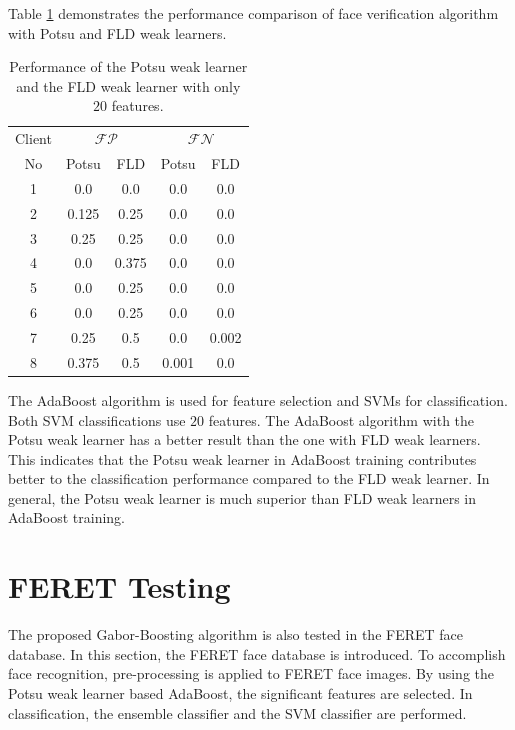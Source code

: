 \mbox{Table} \ref{tab:potsuvsfld} demonstrates the performance comparison of face verification algorithm with Potsu and FLD weak learners.
\begin{table}[ht]
\begin{center}
\caption{Performance of the Potsu weak learner and the FLD weak learner with only $20$ features.}
 \begin{tabular}{|c|c|c|c|c|}
   \hline
   {Client} & \multicolumn{2}{c|}{{$\mathcal{FP}$}} & \multicolumn{2}{c|}{{$\mathcal{FN}$}}\\
   \cline{2-5}
   {No} & {Potsu} & {FLD} & {Potsu} & {FLD} \\
   \hline
   1 & 0.0 & 0.0 & 0.0 & 0.0 \\
   2 & 0.125 & 0.25 & 0.0 & 0.0 \\
   3 & 0.25 & 0.25 & 0.0 & 0.0 \\
   4 & 0.0 & 0.375 & 0.0 & 0.0 \\
   5 & 0.0 & 0.25 & 0.0 & 0.0 \\
   6 & 0.0 & 0.25 & 0.0 & 0.0 \\
   7 & 0.25 & 0.5 & 0.0 & 0.002 \\
   8 & 0.375 & 0.5 & 0.001 & 0.0 \\
   \hline
 \end{tabular} 
\label{tab:potsuvsfld}
\end{center}
\end{table}
The AdaBoost algorithm is used for feature selection and SVMs for classification. Both SVM classifications use $20$ features. The AdaBoost algorithm with the Potsu weak learner has a better result than the one with FLD weak learners. This indicates that the Potsu weak learner in AdaBoost training contributes better to the classification performance compared to the FLD weak learner. In general, the Potsu weak learner is much superior than FLD weak learners in AdaBoost training.

\section{FERET Testing}
\label{sec:feret}
The proposed Gabor-Boosting algorithm is also tested in the \mbox{FERET} face database. In this section, the \mbox{FERET} face database is introduced. To accomplish face recognition, pre-processing is applied to \mbox{FERET} face images. By using the Potsu weak learner based AdaBoost, the significant features are selected. In classification, the ensemble classifier and the SVM classifier are performed. %
